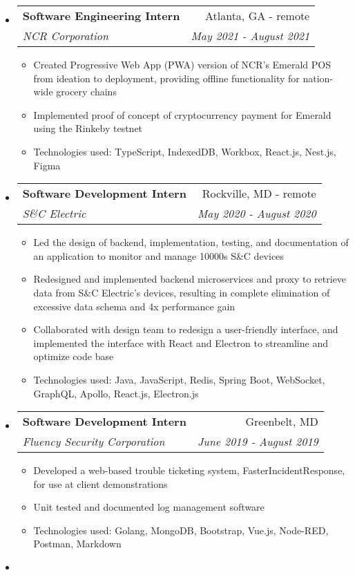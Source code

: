 \documentclass[letterpaper,10pt]{article}
\makeatletter
\newcommand{\resitem}[1]{\item #1 \vspace{-2pt}}
\newcommand{\ressubheading}[4]{
\begin{tabular*}{7.0in}{l@{\extracolsep{\fill}}r}
		\textbf{#1} & #2 \\
		\textit{#3} & \textit{#4} \\
\end{tabular*}\vspace{-6pt}}
\makeatother
\begin{document}
\begin{itemize}
\item
    \ressubheading{Software Engineering Intern}{Atlanta, GA - remote}{NCR Corporation}{May 2021 - August 2021}
    \begin{itemize}
        \resitem{Created Progressive Web App (PWA) version of NCR's Emerald POS from ideation to deployment, providing offline functionality for nation-wide grocery chains}
        \resitem{Implemented proof of concept of cryptocurrency payment for Emerald using the Rinkeby testnet}
        \resitem{Technologies used: TypeScript, IndexedDB, Workbox, React.js, Nest.js, Figma}
    \end{itemize}
\item
    \ressubheading{Software Development Intern}{Rockville, MD - remote}{S\&C Electric}{May 2020 - August 2020}
    \begin{itemize}
        \resitem{Led the design of backend, implementation, testing, and documentation of an application to monitor and manage 10000s S\&C devices}
        \resitem{Redesigned and implemented backend microservices and proxy to retrieve data from S\&C Electric's devices, resulting in complete elimination of excessive data schema and 4x performance gain}
        \resitem{Collaborated with design team to redesign a user-friendly interface, and implemented the interface with React and Electron to streamline and optimize code base}
        \resitem{Technologies  used: Java, JavaScript, Redis, Spring Boot, WebSocket, GraphQL, Apollo, React.js, Electron.js}
    \end{itemize}
\item
    \ressubheading{Software Development Intern}{Greenbelt, MD}{Fluency Security Corporation}{June 2019 - August 2019}
	\begin{itemize}
	    \resitem{Developed a web-based trouble ticketing system, FasterIncidentResponse, for use at client demonstrations}
		\resitem{Unit tested and documented log management software}
		\resitem{Technologies used: Golang, MongoDB, Bootstrap, Vue.js, Node-RED, Postman, Markdown}
	\end{itemize}
\item

\end{itemize}
\end{document}
